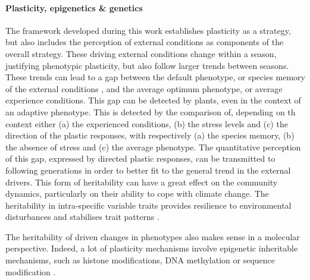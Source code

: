 

\paragraph{Plasticity, epigenetics \& genetics}

The framework developed during this work establishes plasticity as a strategy, but also includes the perception of external conditions as components of the overall strategy. These driving external conditions change within a season, justifying phenotypic plasticity, but also follow larger trends between seasons. These trends can lead to a gap between the default phenotype, or species memory of the external conditions , and the average optimum phenotype, or average experience conditions. This gap can be detected by plants, even in the context of an adaptive phenotype. This is detected by the comparison of, depending on th context either (a) the experienced conditions, (b) the stress levels and (c) the direction of the plastic responses, with respectively (a) the species memory, (b) the absence of stress and (c) the average phenotype. The quantitative perception of this gap, expressed by directed plastic responses, can be transmitted to following generations in order to better fit to the general trend in the external drivers. This form of heritability can have a great effect on the community dynamics, particularly on their ability to cope with climate change. The heritability in intra-specific variable traits provides resilience to environmental disturbances and stabilises trait patterns \parencite{barabas_effect_2016}.

The heritability of driven changes in phenotypes also makes sense in a molecular perspective. Indeed, a lot of plasticity mechanisms involve epigenetic inheritable mechanisms, such as histone modifications, DNA methylation or sequence modification \parencite{nicotra_plant_2010}.

